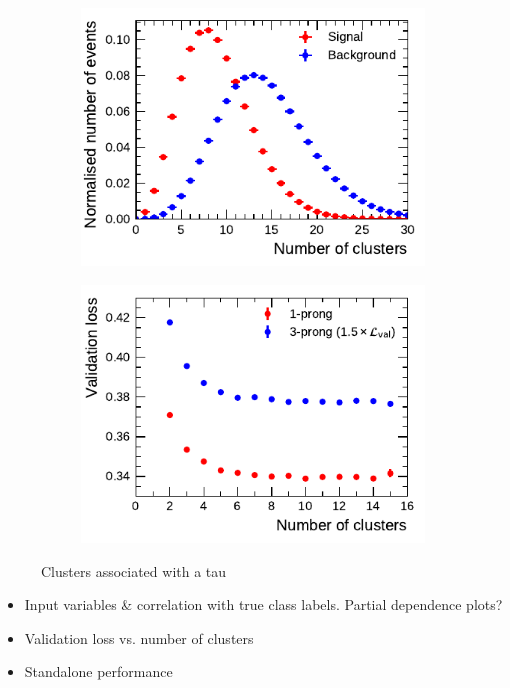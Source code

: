 \begin{figure}[ht]
  \begin{subfigure}[t]{0.48\textwidth}
    \centering
    \includegraphics{./figures/rnn/ncls_1p.pdf}
  \end{subfigure}%
  \begin{subfigure}[t]{0.48\textwidth}
    \centering
    \includegraphics{./figures/rnn/nscan/cluster_1p_3p.pdf}
  \end{subfigure}
  \caption{Clusters associated with a tau}
  \label{fig:rnn_nclusters}
\end{figure}


\begin{itemize}
\item Input variables \& correlation with true class labels. Partial
  dependence plots?
\item Validation loss vs. number of clusters
\item Standalone performance
\end{itemize}


